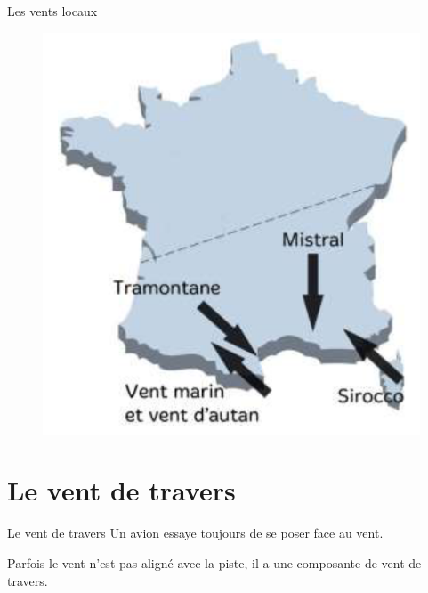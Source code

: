 \documentclass{beamer}
\begin{document}
\begin{frame}{Les vents locaux}
  
  \begin{figure}
    \centering
    \includegraphics[scale=1]{images/vents.png}
  \end{figure}
\end{frame}

\section{Le vent de travers}

\begin{frame}{Le vent de travers}
  Un avion essaye toujours de se poser face au vent.

  Parfois le vent n'est pas aligné avec la piste, il a une composante de vent de travers.

\end{frame}
\end{document}
